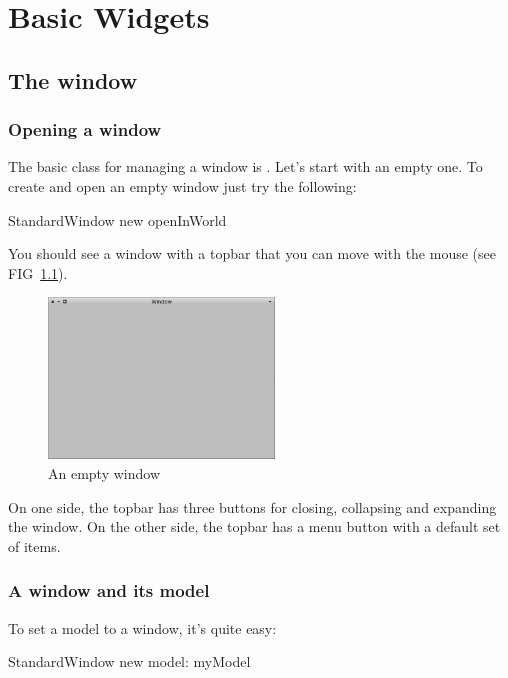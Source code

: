 \documentclass[a4paper,10pt,twoside]{book}
\begin{document}
\fi
\sloppy

\chapter{Basic Widgets}

\section{The window}
\subsection{Opening a window}
The basic class for managing a window is . Let's start with an empty one. To create and open an empty window just try the following:
\begin{code}{}
StandardWindow new openInWorld
\end{code}
You should see a window with a topbar that you can move with the mouse (see FIG~\ref{fig:emptyWindow}). 

\begin{figure}[ht]\centering
	\includegraphics[width=6cm]{EmptyWindow}
	\caption{An empty window}
	\label{fig:emptyWindow}
\end{figure} 

On one side, the topbar has three buttons for closing, collapsing and expanding the window. On the other side, the topbar has a menu button with a default set of items.

\subsection{A window and its model}

To set a model to a window, it's quite easy:

\begin{code}{}
StandardWindow new model: myModel
\end{code}
\end{document}
